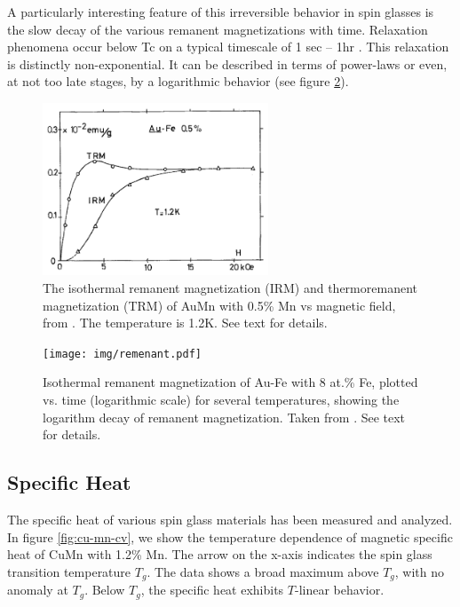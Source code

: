 A particularly interesting feature of this irreversible behavior in spin glasses 
is the slow decay of the various remanent magnetizations with time. 
Relaxation phenomena occur below Tc on a typical timescale of 1 sec -- 1hr
\cite{tholence:jpa-00215633,Holtzberg1977,NIEUWENHUYS1977880}. This relaxation is distinctly non-exponential. It can be 
described in terms of power-laws\cite{NIEUWENHUYS1977880} or even, at not too late stages, by a 
logarithmic behavior\cite{Holtzberg1977} (see figure \ref{fig:au-fe-remanent}).


\begin{figure}
   \centering
  \includegraphics[width=0.6\textwidth]{img/trm-irm.png}
  \caption{\label{fig:trm-irm}The isothermal remanent magnetization (IRM) and 
thermoremanent magnetization (TRM) of AuMn with 0.5\% Mn vs magnetic field, 
from \citet{tholence:jpa-00215633}. The temperature is 1.2K. See text for details.
}
\end{figure}

\begin{figure}
  \centering
  \texttt{[image: img/remenant.pdf]}
  \caption{ \label{fig:au-fe-remanent}Isothermal remanent magnetization of Au-Fe 
with 8 at.\% Fe, 
plotted vs. time (logarithmic scale) for several temperatures, showing the 
logarithm decay of remanent magnetization.
Taken from \citet{Holtzberg1977}. See text for details.
}
\end{figure}

\subsection{Specific Heat}
The specific heat of various spin glass materials has been measured and analyzed. 
In figure \ref{fig:cu-mn-cv}, we show the temperature dependence of magnetic 
specific heat of CuMn with 1.2\% Mn. The arrow on the x-axis indicates the spin glass
transition temperature $T_g$. The data shows a broad maximum above $T_g$, with no
anomaly at $T_g$. Below $T_g$, the specific heat exhibits $T$-linear behavior.


